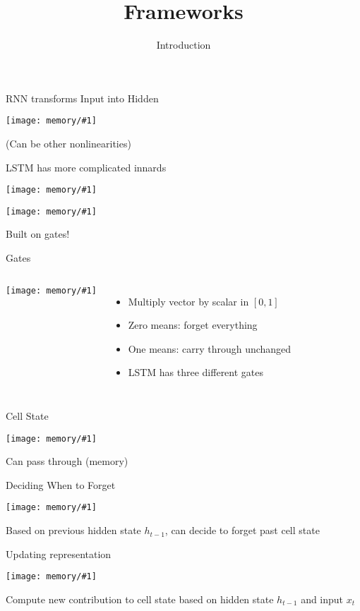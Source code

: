 \documentclass[compress]{beamer}
\title{Frameworks}
\date{Introduction}
\newcommand{\gfx}[2]{
\begin{center}
	\texttt{[image: memory/\#1]}
\end{center}
}
\begin{document}


\begin{frame}{RNN transforms Input into Hidden}

  \gfx{LSTM3-SimpleRNN}{.9}

  (Can be other nonlinearities)

\end{frame}

\begin{frame}{LSTM has more complicated innards}

  \gfx{LSTM3-chain}{.9}
  \gfx{LSTM2-notation}{.8}
  \pause
  Built on gates!

\end{frame}


\begin{frame}{Gates}

\begin{columns}
  \gfx{LSTM3-gate}{.7}
  \begin{itemize}
    \item Multiply vector by scalar in $[0,1]$
    \item Zero means: forget everything
    \item One means: carry through unchanged
    \item LSTM has three different gates
  \end{itemize}
\end{columns}

\end{frame}


\begin{frame}{Cell State}

  \gfx{LSTM3-C-line}{.9}
  Can pass through (memory)
\end{frame}

\begin{frame}{Deciding When to Forget}

  \gfx{LSTM3-focus-f}{.9}

  Based on previous hidden state $h_{t-1}$, can decide to forget past cell state

\end{frame}

\begin{frame}{Updating representation}

  \gfx{LSTM3-focus-i}{.9}

  Compute new contribution to cell state based on hidden state
  $h_{t-1}$ and input $x_t$

\end{frame}
\end{document}
